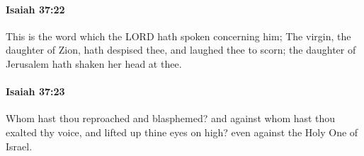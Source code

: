 		\paragraph{Isaiah 37:22} %
			\label{ISAIAH-37-22}

			This is the word which the LORD hath spoken concerning him; The virgin, the daughter of Zion, hath despised thee, and laughed thee to scorn; the daughter of Jerusalem hath shaken her head at thee.


		\paragraph{Isaiah 37:23} %
			\label{ISAIAH-37-23}

			Whom hast thou reproached and blasphemed? and against whom hast thou exalted thy voice, and lifted up thine eyes on high? even against the Holy One of Israel.


